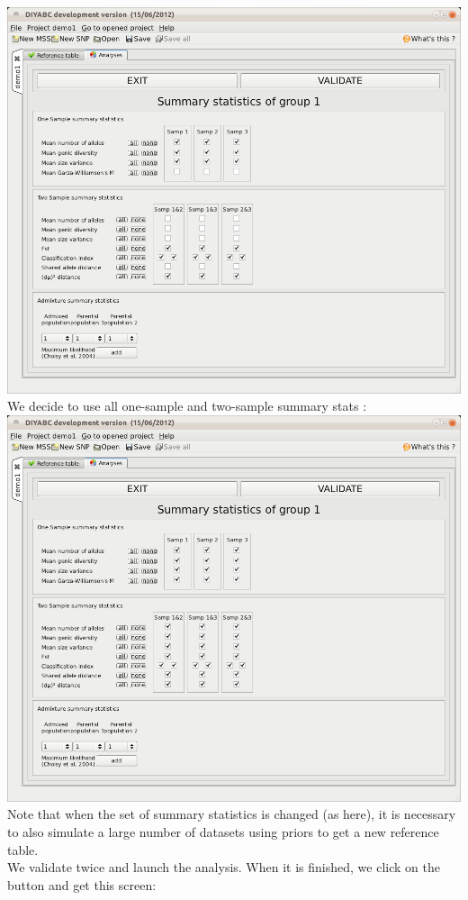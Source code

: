 \includegraphics[scale=0.35]{gui_pictures/Capture-DIYABC-56.png} \\

We decide to use all one-sample and two-sample summary stats :\\

\includegraphics[scale=0.35]{gui_pictures/Capture-DIYABC-57.png} \\
 

Note that when the set of summary statistics is changed (as here), it is necessary to also simulate a large number of datasets using priors to get a new reference table.\\
 We validate twice and launch the analysis. When it is finished, we click on the   button and get this screen:\\

